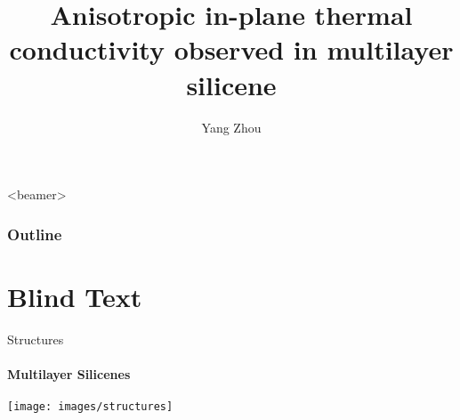 \documentclass{beamer}
\title{Anisotropic in-plane thermal conductivity observed in multilayer silicene} %
\author{Yang Zhou}
\begin{document}
\frame{
\maketitle \\
{\color{white} \today}}


\begin{frame}<beamer>
  \frametitle{Outline} %
  \tableofcontents
\end{frame}


\section{Blind Text}
\begin{frame}{Structures}
  \framesubtitle{Multilayer Silicenes}%
  \texttt{[image: images/structures]}
\end{frame}
\end{document}
